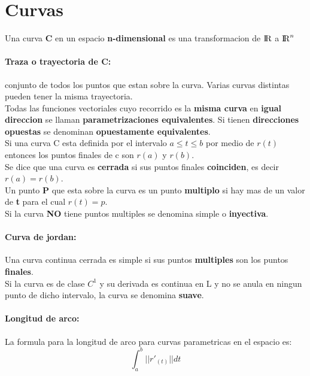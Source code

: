 \documentclass[11pt]{article}
\begin{document}
\section{Curvas}
Una curva \textbf{C} en un espacio \textbf{n-dimensional} es una transformacion de ${\rm I\!R}$ a ${\rm I\!R}^n$
\paragraph{Traza o trayectoria de C:}conjunto de todos los puntos que estan sobre la curva.
Varias curvas distintas pueden tener la misma trayectoria.\\
\linebreak
Todas las funciones vectoriales cuyo recorrido es la \textbf{misma curva} en \textbf{igual direccion} se llaman \textbf{parametrizaciones equivalentes}. Si tienen \textbf{direcciones opuestas} se denominan \textbf{opuestamente equivalentes}.\\
\linebreak
Si una curva C esta definida por el intervalo $a \leq t \leq b$ por medio de $r(t)$ entonces los puntos finales de c son $r(a)$ y $r(b)$.\\
\linebreak
Se dice que una curva es \textbf{cerrada} si sus puntos finales \textbf{coinciden}, es decir $r(a) = r(b)$.\\
\linebreak
Un punto \textbf{P} que esta sobre la curva es un punto \textbf{multiplo} si hay mas de un valor de \textbf{t} para el cual $r(t) = p$.\\
\linebreak
Si la curva \textbf{NO} tiene puntos multiples se denomina simple o \textbf{inyectiva}.\\
\linebreak
\paragraph{Curva de jordan:} Una curva continua cerrada es simple si sus puntos \textbf{multiples} son los puntos \textbf{finales}.\\
\linebreak
Si la curva es de clase $C^1$ y su derivada es continua en L y no se anula en ningun punto de dicho intervalo, la curva se denomina \textbf{suave}.
\paragraph{Longitud de arco:} La formula para la longitud de arco para curvas parametricas en el espacio es:
\begin{equation*}
	\int_a^b ||r'_{(t)}||dt
\end{equation*}
\end{document}
